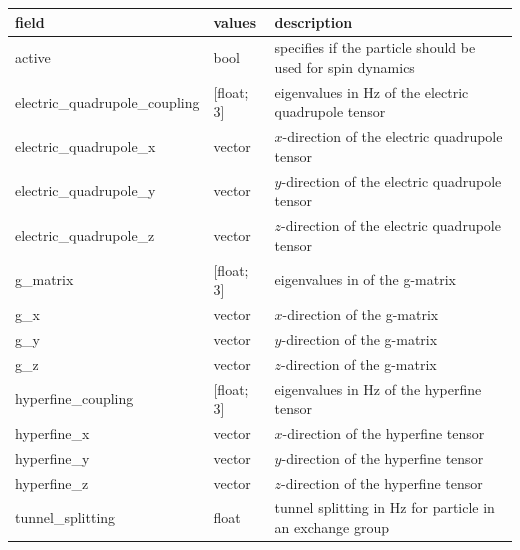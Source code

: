 \documentclass{book}
\begin{document}
\begin{center}
\begin{tabular}{| m{20em} | m{1.5cm}| m{7cm} |}
 \hline 
 \textbf{field} & \textbf{values} & \textbf{description} \\ 
 \hline 
 active & bool & 
 specifies if the particle should be used for spin dynamics\\
 \hline 
 electric\_quadrupole\_coupling & [float; 3] & 
 eigenvalues in Hz of the electric quadrupole tensor\\
 \hline 
 electric\_quadrupole\_x & 
 vector & $x$-direction of the electric quadrupole tensor\\
 \hline 
 electric\_quadrupole\_y & 
 vector & $y$-direction of the electric quadrupole tensor\\
 \hline 
 electric\_quadrupole\_z & 
 vector & $z$-direction of the electric quadrupole tensor\\
 \hline 
 g\_matrix & [float; 3] & eigenvalues in of the g-matrix\\
 \hline 
 g\_x & vector & $x$-direction of the g-matrix\\
 \hline 
 g\_y & vector & $y$-direction of the g-matrix\\
 \hline 
 g\_z & vector & $z$-direction of the g-matrix\\
 \hline 
 hyperfine\_coupling & [float; 3] & eigenvalues in Hz of the hyperfine tensor\\
 \hline 
 hyperfine\_x & vector & $x$-direction of the hyperfine tensor\\
 \hline 
 hyperfine\_y & vector & $y$-direction of the hyperfine tensor\\
 \hline 
 hyperfine\_z & vector & $z$-direction of the hyperfine tensor\\
 \hline 
 tunnel\_splitting & float & 
 tunnel splitting in Hz for particle in an exchange group \\
 \hline 
\end{tabular}
\end{center} 
\end{document}
